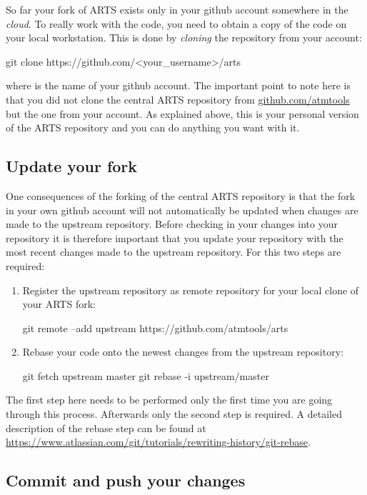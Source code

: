 So far your fork of ARTS exists only in your github account somewhere in
the \textit{cloud}. To really work with the code, you need to obtain a copy
of the code on your local workstation. This is done by \textit{cloning} the
repository from your account:
\begin{code}
  git clone https://github.com/<your_username>/arts
\end{code}

where  is the name of your github account. The
important point to note here is that you did not clone the central ARTS
repository from \url{github.com/atmtools} but the one from your account. As
explained above, this is your personal version of the ARTS repository
and you can do anything you want with it.

\subsection{Update your fork}

One consequences of the forking of the central ARTS repository is that the
fork in your own github account will not automatically be updated when
changes are made to the upstream repository. Before checking in your changes
into your repository it is therefore important that you update your repository
with the most recent changes made to the upstream repository. For this two
steps are required:

\begin{enumerate}
\item Register the upstream repository as remote repository for your local clone of your ARTS fork:
  \begin{code}
    git remote --add upstream https://github.com/atmtools/arts
  \end{code}
\item Rebase your code onto the newest changes from the upstream repository:
  \begin{code}
    git fetch upstream master
    git rebase -i upstream/master
  \end{code}
\end{enumerate}

The first step here needs to be performed only the first time you are going
through this process. Afterwards only the second step is required. A detailed
description of the rebase step can be found at \url{https://www.atlassian.com/git/tutorials/rewriting-history/git-rebase}.

\subsection{Commit and push your changes}

